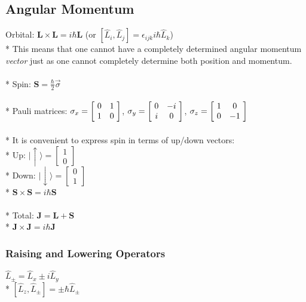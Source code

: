 \subsection{Angular Momentum}
Orbital: \(\mathbf{L}\times\mathbf{L}=i\hbar\mathbf{L}\) (or \([\hat{L}_i,\hat{L}_j]=\epsilon_{ijk}i\hbar\hat{L}_k\))\\*
This means that one cannot have a completely determined angular momentum \emph{vector} just as one cannot completely determine both position and momentum.\\\\*
Spin: \(\mathbf{S}=\frac{\hbar}{2}\vec{\sigma}\)\\\\*
Pauli matrices: \(\sigma_x= \left[\!
  \begin{array}{ c c }
     0 & 1 \\
     1 & 0
  \end{array} \!\right]
\),
\(\sigma_y= \left[\!
  \begin{array}{ c c }
     0 & -i \\
     i & 0
  \end{array} \!\right]
\),
\(\sigma_z= \left[\!
  \begin{array}{ c c }
     1 & 0 \\
     0 & -1
  \end{array} \!\right]
\)\\\\*
It is convenient to express spin in terms of up/down vectors:\\*
Up: \(|\!\uparrow\rangle=\left[\!\begin{array}{c}1 \\ 0 \end{array}\!\right]\)\\*
Down: \(|\!\downarrow\rangle=\left[\!\begin{array}{c}0 \\ 1 \end{array}\!\right]\)\\*
\(\mathbf{S}\times\mathbf{S}=i\hbar\mathbf{S}\)\\\\*
Total: \(\mathbf{J}=\mathbf{L}+\mathbf{S}\)\\*
\(\mathbf{J}\times\mathbf{J}=i\hbar\mathbf{J}\)

\subsubsection{Raising and Lowering Operators}
\(\hat{L}_\pm=\hat{L}_x\pm i\hat{L}_y\)\\*
\([\hat{L}_z,\hat{L}_\pm]=\pm\hbar\hat{L}_\pm\)

